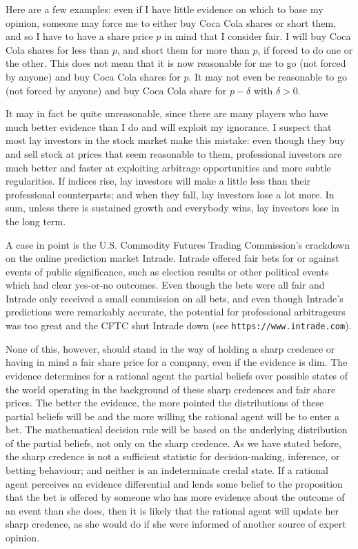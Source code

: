 \documentclass[11pt]{article}
\begin{document}
Here are a few examples: even if I have little evidence on which to
base my opinion, someone may force me to either buy Coca Cola shares
or short them, and so I have to have a share price $p$ in mind that I
consider fair. I will buy Coca Cola shares for less than $p$, and
short them for more than $p$, if forced to do one or the other. This
does not mean that it is now reasonable for me to go (not forced by
anyone) and buy Coca Cola shares for $p$. It may not even be
reasonable to go (not forced by anyone) and buy Coca Cola share for
$p-\delta$ with $\delta{}>0$. 

It may in fact be quite unreasonable, since there are many players who
have much better evidence than I do and will exploit my ignorance. I
suspect that most lay investors in the stock market make this mistake:
even though they buy and sell stock at prices that seem reasonable to
them, professional investors are much better and faster at exploiting
arbitrage opportunities and more subtle regularities. If indices rise,
lay investors will make a little less than their professional
counterparts; and when they fall, lay investors lose a lot more. In
sum, unless there is sustained growth and everybody wins, lay
investors lose in the long term.

A case in point is the U.S. Commodity Futures Trading Commission's
crackdown on the online prediction market Intrade. Intrade offered
fair bets for or against events of public significance, such as
election results or other political events which had clear yes-or-no
outcomes. Even though the bets were all fair and Intrade only received
a small commission on all bets, and even though Intrade's predictions
were remarkably accurate, the potential for professional arbitrageurs
was too great and the CFTC shut Intrade down (see
\texttt{https://www.intrade.com}). 

None of this, however, should stand in the way of holding a sharp
credence or having in mind a fair share price for a company, even if
the evidence is dim. The evidence determines for a rational agent the
partial beliefs over possible states of the world operating in the
background of these sharp credences and fair share prices. The better
the evidence, the more pointed the distributions of these partial
beliefs will be and the more willing the rational agent will be to
enter a bet. The mathematical decision rule will be based on the
underlying distribution of the partial beliefs, not only on the sharp
credence. As we have stated before, the sharp credence is not a
sufficient statistic for decision-making, inference, or betting
behaviour; and neither is an indeterminate credal state. If a rational
agent perceives an evidence differential and lends some belief to the
proposition that the bet is offered by someone who has more evidence
about the outcome of an event than she does, then it is likely that
the rational agent will update her sharp credence, as she would do if
she were informed of another source of expert opinion.
\end{document}
